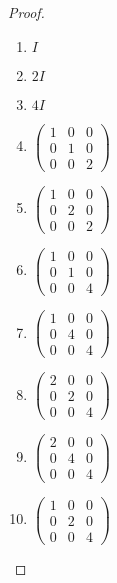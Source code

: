 \documentclass[10pt]{amsart}
\begin{document}
\begin{thm}
\begin{proof}
    \begin{enumerate}
      \item
        $I$
      \item
        $2I$
      \item
        $4I$
      \item
        $
        \begin{pmatrix}
          1 & 0 & 0\\
          0 & 1 & 0\\
          0 & 0 & 2
        \end{pmatrix} 
        $
      \item
        $\begin{pmatrix}
          1 & 0 & 0\\
          0 & 2 & 0\\
          0 & 0 & 2
        \end{pmatrix}$
      \item
        $\begin{pmatrix}
          1 & 0 & 0\\
          0 & 1 & 0\\
          0 & 0 & 4
        \end{pmatrix}$
      \item
        $\begin{pmatrix}
          1 & 0 & 0\\
          0 & 4 & 0\\
          0 & 0 & 4
        \end{pmatrix}$
      \item
        $\begin{pmatrix}
          2 & 0 & 0\\
          0 & 2 & 0\\
          0 & 0 & 4
        \end{pmatrix}
        $
      \item
        $\begin{pmatrix}
          2 & 0 & 0\\
          0 & 4 & 0\\
          0 & 0 & 4
        \end{pmatrix}$
      \item
        $\begin{pmatrix}
          1 & 0 & 0\\
          0 & 2 & 0\\
          0 & 0 & 4
        \end{pmatrix}$
      \end{enumerate}            
  \end{proof}
\end{thm}
\end{document}
